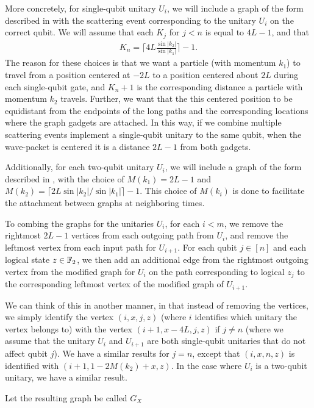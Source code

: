 \documentclass[../thesis-main/thesis-main]{subfiles}
\begin{document}
More concretely, for single-qubit unitary $U_i$, we will include a graph of the form described in  with the scattering event corresponding to the unitary $U_i$ on the correct qubit.  We will assume that each $K_j$ for $j<n$ is equal to $4L-1$, and that 
\begin{align}
  K_n = \bigg\lceil 4 L \frac{ \sin |k_2|}{\sin |k_1|}\bigg\rceil - 1.
\end{align}
The reason for these choices is that we want a particle (with momentum $k_1$) to travel from a position centered at $-2L$ to a position centered about $2L$ during each single-qubit gate, and $K_n+1$ is the corresponding distance a particle with momentum $k_2$ travels.  Further, we want that the this centered position to be equidistant from the endpoints of the long paths and the corresponding locations where the graph gadgets are attached.  In this way, if we combine multiple scattering events implement a single-qubit unitary to the same qubit, when the wave-packet is centered it is a distance $2L-1$ from both gadgets.

Additionally, for each two-qubit unitary $U_i$, we will include a graph of the form described in , with the choice of $M(k_1) = 2L-1$ and $M(k_2) = \lceil 2 L\sin |k_2|/\sin |k_1|\rceil -1$.  This choice of $M(k_i)$ is done to facilitate the attachment between graphs at neighboring times.

To combing the graphs for the unitaries $U_i$, for each $i < m$, we remove the rightmost $2L-1$ vertices from each outgoing path from $U_i$, and remove the leftmost vertex from each input path for $U_{i+1}$.  For each qubit $j\in [n]$ and each logical state $z\in \mathbb{F}_2$, we then add an additional edge from the rightmost outgoing vertex from the modified graph for $U_i$ on the path corresponding to logical $z_j$ to the corresponding leftmost vertex of the modified graph of $U_{i+1}$. 

We can think of this in another manner, in that instead of removing the vertices, we simply identify the vertex $(i,x,j,z)$ (where $i$ identifies which unitary the vertex belongs to) with the vertex $(i+1,x-4L,j,z)$ if $j\neq n$ (where we assume that the unitary $U_i$ and $U_{i+1}$ are both single-qubit unitaries that do not affect qubit $j$).  We have a similar results for $j=n$, except that $(i,x,n,z)$ is identified with $(i+1,1- 2M(k_2) + x,z)$.  In the case where $U_i$ is a two-qubit unitary, we have a similar result.

Let the resulting graph be called $G_{X}$
\end{document}
